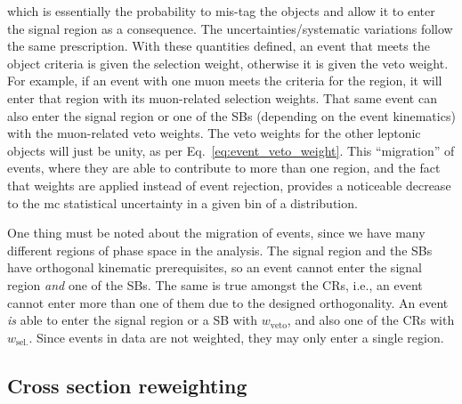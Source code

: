 which is essentially the probability to mis-tag the objects and allow it to enter the signal region as a consequence. The uncertainties/systematic variations follow the same prescription. With these quantities defined, an event that meets the object criteria is given the selection weight, otherwise it is given the veto weight. For example, if an event with one muon meets the criteria for the \singleMuCr region, it will enter that region with its muon-related selection weights. That same event can also enter the signal region or one of the \glspl{SB} (depending on the event kinematics) with the muon-related veto weights. The veto weights for the other leptonic objects will just be unity, as per Eq.~\ref{eq:event_veto_weight}. This ``migration'' of events, where they are able to contribute to more than one region, and the fact that weights are applied instead of event rejection, provides a noticeable decrease to the \acrlong{mc} statistical uncertainty in a given bin of a distribution.

One thing must be noted about the migration of events, since we have many different regions of phase space in the analysis. The signal region and the \glspl{SB} have orthogonal kinematic prerequisites, so an event cannot enter the signal region \emph{and} one of the \glspl{SB}. The same is true amongst the \glspl{CR}, i.e., an event cannot enter more than one of them due to the designed orthogonality. An event \emph{is} able to enter the signal region or a \gls{SB} with $w_{\mathrm{veto}}$, and also one of the \glspl{CR} with $w_{\mathrm{sel.}}$. Since events in data are not weighted, they may only enter a single region.





\subsection{Cross section reweighting}
\label{subsec:xs_weighting}

